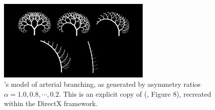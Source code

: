 \documentclass[a4paper, 11pt]{article}
\begin{document}
\begin{flushleft}
\begin{figure}[h]
\centering
\includegraphics[width=0.66\textwidth]{Zamir's Model}
\caption{\citeauthor{zamirArterialBranchingLSystems}'s model of arterial branching, as generated by asymmetry ratios $\alpha = 1.0, 0.8, \cdots, 0.2$. This is an explicit copy of \citeauthor{zamirArterialBranchingLSystems} (\citeyear{zamirArterialBranchingLSystems}, Figure 8), recreated within the DirectX framework.}
\label{Zamir's Model}
\end{figure}





\end{flushleft}
\end{document}
